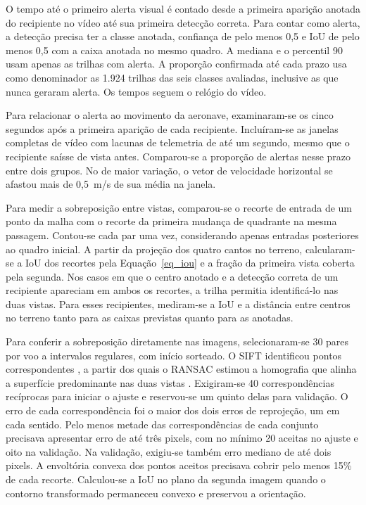 O tempo até o primeiro alerta visual é contado desde a primeira aparição anotada do recipiente no vídeo até sua primeira detecção correta. Para contar como alerta, a detecção precisa ter a classe anotada, confiança de pelo menos 0,5 e IoU de pelo menos 0,5 com a caixa anotada no mesmo quadro. A mediana e o percentil 90 usam apenas as trilhas com alerta. A proporção confirmada até cada prazo usa como denominador as 1.924 trilhas das seis classes avaliadas, inclusive as que nunca geraram alerta. Os tempos seguem o relógio do vídeo.

Para relacionar o alerta ao movimento da aeronave, examinaram-se os cinco segundos após a primeira aparição de cada recipiente. Incluíram-se as janelas completas de vídeo com lacunas de telemetria de até um segundo, mesmo que o recipiente saísse de vista antes. Comparou-se a proporção de alertas nesse prazo entre dois grupos. No de maior variação, o vetor de velocidade horizontal se afastou mais de 0,5~m/s de sua média na janela.

Para medir a sobreposição entre vistas, comparou-se o recorte de entrada de um ponto da malha com o recorte da primeira mudança de quadrante na mesma passagem. Contou-se cada par uma vez, considerando apenas entradas posteriores ao quadro inicial. A partir da projeção dos quatro cantos no terreno, calcularam-se a IoU dos recortes pela Equação~\eqref{eq_iou} e a fração da primeira vista coberta pela segunda. Nos casos em que o centro anotado e a detecção correta de um recipiente apareciam em ambos os recortes, a trilha permitia identificá-lo nas duas vistas. Para esses recipientes, mediram-se a IoU e a distância entre centros no terreno tanto para as caixas previstas quanto para as anotadas.

Para conferir a sobreposição diretamente nas imagens, selecionaram-se 30 pares por voo a intervalos regulares, com início sorteado. O SIFT identificou pontos correspondentes \cite{lowe2004sift}, a partir dos quais o RANSAC estimou a homografia que alinha a superfície predominante nas duas vistas \cite{fischler1981ransac}. Exigiram-se 40 correspondências recíprocas para iniciar o ajuste e reservou-se um quinto delas para validação. O erro de cada correspondência foi o maior dos dois erros de reprojeção, um em cada sentido. Pelo menos metade das correspondências de cada conjunto precisava apresentar erro de até três pixels, com no mínimo 20 aceitas no ajuste e oito na validação. Na validação, exigiu-se também erro mediano de até dois pixels. A envoltória convexa dos pontos aceitos precisava cobrir pelo menos 15\% de cada recorte. Calculou-se a IoU no plano da segunda imagem quando o contorno transformado permaneceu convexo e preservou a orientação.

